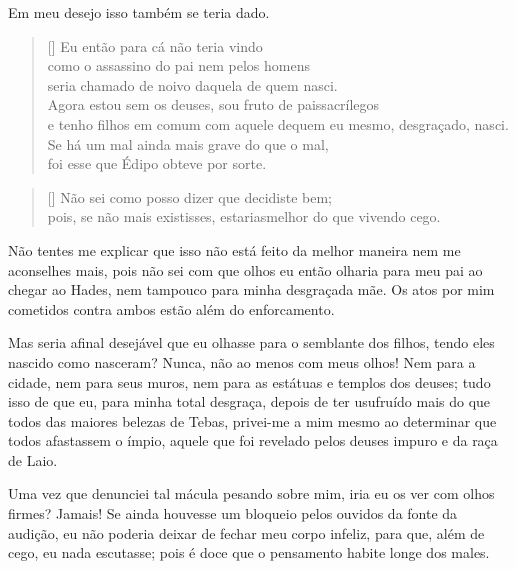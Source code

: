   Em meu desejo isso também se teria dado.


\settowidth{\versewidth}{e tenho filhos em comum com aquele de quem eu mesmo,}
\begin{verse}[\versewidth]
Eu então para cá não teria vindo\\
como o assassino do pai nem pelos homens\\
seria chamado de noivo daquela de quem nasci.\\
Agora estou sem os deuses, sou fruto de pais\qb sacrílegos\\
e tenho filhos em comum com aquele de\qb quem eu mesmo, desgraçado, nasci.\\
Se há um mal ainda mais grave do que o mal,\\
foi esse que Édipo obteve por sorte.
\end{verse}



\settowidth{\versewidth}{Não sei como posso dizer que decidiste bem;}
\begin{verse}[\versewidth]
Não sei como posso dizer que decidiste bem;\\
pois, se não mais existisses, estarias\qb melhor do que vivendo cego.
\end{verse}

   Não tentes me explicar que isso não está feito da melhor maneira
nem me aconselhes mais, pois não sei com que olhos eu então olharia para
meu pai ao chegar ao Hades, nem tampouco para minha desgraçada mãe. Os
atos por mim cometidos contra ambos estão além do enforcamento.

Mas seria afinal desejável que eu olhasse para o semblante dos filhos,
tendo eles nascido como nasceram? Nunca, não ao menos com meus olhos!
Nem para a cidade, nem para seus muros, nem para as estátuas e templos
dos deuses; tudo isso de que eu, para minha total desgraça,
depois de ter usufruído mais do que todos das maiores belezas de Tebas,
privei-me a mim mesmo ao determinar que todos afastassem o ímpio,
aquele que foi revelado pelos deuses impuro e da raça de Laio.

Uma vez que denunciei tal mácula pesando sobre mim, iria eu os ver com
olhos firmes? Jamais! Se ainda houvesse um bloqueio pelos ouvidos da
fonte da audição, eu não poderia deixar de fechar meu corpo infeliz,
para que, além de cego, eu nada escutasse; pois é doce que o
pensamento habite longe dos males.


